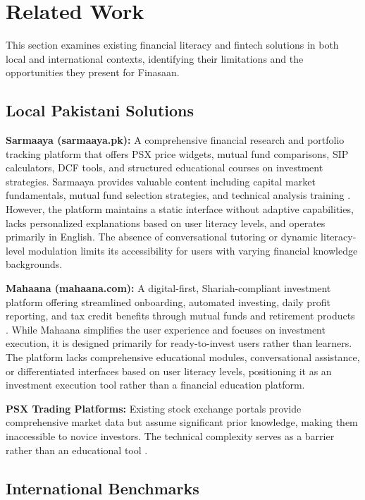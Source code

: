 \documentclass[12pt]{article}
\begin{document}
\section{Related Work}
This section examines existing financial literacy and fintech solutions in both local and international contexts, identifying their limitations and the opportunities they present for Finasaan.

\subsection{Local Pakistani Solutions}

\textbf{Sarmaaya (sarmaaya.pk):} A comprehensive financial research and portfolio tracking platform that offers PSX price widgets, mutual fund comparisons, SIP calculators, DCF tools, and structured educational courses on investment strategies. Sarmaaya provides valuable content including capital market fundamentals, mutual fund selection strategies, and technical analysis training \cite{sarmaaya2023}. However, the platform maintains a static interface without adaptive capabilities, lacks personalized explanations based on user literacy levels, and operates primarily in English. The absence of conversational tutoring or dynamic literacy-level modulation limits its accessibility for users with varying financial knowledge backgrounds.

\textbf{Mahaana (mahaana.com):} A digital-first, Shariah-compliant investment platform offering streamlined onboarding, automated investing, daily profit reporting, and tax credit benefits through mutual funds and retirement products \cite{mahaana2023}. While Mahaana simplifies the user experience and focuses on investment execution, it is designed primarily for ready-to-invest users rather than learners. The platform lacks comprehensive educational modules, conversational assistance, or differentiated interfaces based on user literacy levels, positioning it as an investment execution tool rather than a financial education platform.

\textbf{PSX Trading Platforms:} Existing stock exchange portals provide comprehensive market data but assume significant prior knowledge, making them inaccessible to novice investors. The technical complexity serves as a barrier rather than an educational tool \cite{psx2023}.

\subsection{International Benchmarks}
\end{document}
